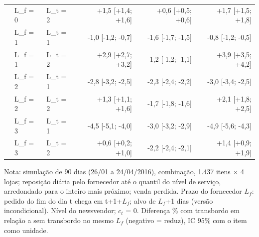 \begin{table}[htbp]
\begin{tabular}{lllrrr}
 & L\_f = 0 & L\_t = 2 & +1,5 [+1,4; +1,6] & +0,6 [+0,5; +0,6] & +1,7 [+1,5; +1,8] \\
 & L\_f = 1 & L\_t = 1 & -1,0 [-1,2; -0,7] & -1,6 [-1,7; -1,5] & -0,8 [-1,2; -0,5] \\
 & L\_f = 1 & L\_t = 2 & +2,9 [+2,7; +3,2] & -1,2 [-1,2; -1,1] & +3,9 [+3,5; +4,2] \\
 & L\_f = 2 & L\_t = 1 & -2,8 [-3,2; -2,5] & -2,3 [-2,4; -2,2] & -3,0 [-3,4; -2,5] \\
 & L\_f = 2 & L\_t = 2 & +1,3 [+1,1; +1,6] & -1,7 [-1,8; -1,6] & +2,1 [+1,8; +2,5] \\
 & L\_f = 3 & L\_t = 1 & -4,5 [-5,1; -4,0] & -3,0 [-3,2; -2,9] & -4,9 [-5,6; -4,3] \\
 & L\_f = 3 & L\_t = 2 & +0,6 [+0,2; +1,0] & -2,2 [-2,4; -2,1] & +1,4 [+0,9; +1,9] \\
\bottomrule
\end{tabular}
\par\smallskip
{\footnotesize Nota: simulação de 90 dias (26/01 a 24/04/2016), combinação, 1.437 itens × 4 lojas; reposição diária pelo fornecedor até o quantil do nível de serviço, arredondado para o inteiro mais próximo; venda perdida. Prazo do fornecedor $L_f$: pedido do fim do dia t chega em t+1+$L_f$; alvo de $L_f$+1 dias (versão incondicional). Nível do newsvendor; $c_t$ = 0. Diferença \% com transbordo em relação a sem transbordo no mesmo $L_f$ (negativo = reduz), IC 95\% com o item como unidade.}
\end{table}
